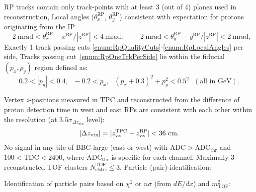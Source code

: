 \begin{enumerate}[label=\textbf{C\arabic*},ref=C\arabic*]
      \begin{enumerate}[label=\textbf{\theenumi.\arabic*},ref=\theenumi.\arabic*]
      \itemm RP tracks contain only track-points with at least 3 (out of 4) planes used in reconstruction,\label{enum:RpQualityCuts}
      \itemm Local angles ($\theta_{x}^{\text{RP}}$, $\theta_{y}^{\text{RP}}$) consistent with expectation for protons originating from the IP\label{enum:RpLocalAngles}%
      \[-2~\text{mrad}<\theta_{x}^{\text{RP}}-x^{\text{RP}}/|z^{\text{RP}}|<4~\text{mrad},~~~~~-2~\text{mrad}<\theta_{y}^{\text{RP}}-y^{\text{RP}}/|z^{\text{RP}}|<2~\text{mrad},\]
      \itemm Exactly 1 track passing cuts \ref{enum:RpQualityCuts}-\ref{enum:RpLocalAngles} per side,\label{enum:RpOneTrkPerSide}
      \itemm Tracks passing cut~\ref{enum:RpOneTrkPerSide} lie within the fiducial $(p_{x},p_{y})$ region defined as\label{enum:RpFiducial}:\\
      \[0.2<|p_{y}|<0.4,~~~-0.2<p_{x},~~~(p_{x}+0.3)^{2}+p_{y}^{2}<0.5^{2}~~~(\text{all in GeV}).\]
    \end{enumerate}
 \itemm Vertex $z$-positions measured in TPC and reconstructed from the difference of proton detection time in west and east RPs are consistent with each other within the resolution (at $3.5\sigma_{\Delta z_{\text{vtx}}}$ level):
 \[|\Delta z_{\text{vtx}}| = |z_{\text{vx}}^{\text{TPC}}-z_{\text{vx}}^{\text{RP}}|<36~\text{cm}.\vspace{-17pt}\]\label{enum:CutDeltaZVx}
 \itemm No signal in any tile of BBC-large (east or west) with $\text{ADC}>\text{ADC}_{\text{thr}}$ and $100<\text{TDC}<2400$, where $\text{ADC}_{\text{thr}}$ is specific for each channel.\label{enum:CutBbcLarge}%
 \itemm Maximally 3 reconstructed TOF clusters $N^{\text{TOF}}_{\text{clstrs}}\leq 3$.\label{enum:CutTofClusters}%
 \itemm Particle (pair) identification:\label{enum:CutPid}
 \begin{enumerate}[label=\textbf{\theenumi.\arabic*},ref=\theenumi.\arabic*]
      \itemm Identification of particle pairs based on $\chi^{2}$ or $n\sigma$ (from $dE/dx$) and $m^{2}_{\text{TOF}}$:\label{enum:CutPidNoPtLimit}\\[3pt]

\end{enumerate}
\end{enumerate}
